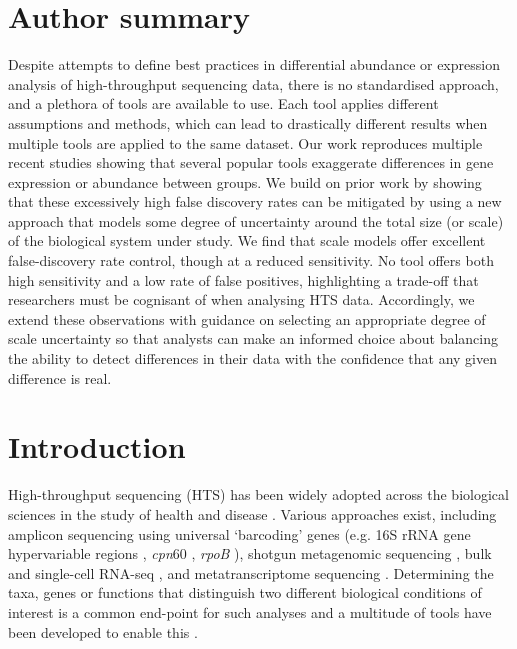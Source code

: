 \documentclass[10pt,letterpaper]{article}
\begin{document}
\section*{Author summary}
Despite attempts to define best practices in differential abundance or expression analysis of high-throughput sequencing data, there is no standardised approach, and a plethora of tools are available to use. Each tool applies different assumptions and methods, which can lead to drastically different results when multiple tools are applied to the same dataset. Our work reproduces multiple recent studies showing that several popular tools exaggerate differences in gene expression or abundance between groups. We build on prior work by showing that these excessively high false discovery rates can be mitigated by using a new approach that models some degree of uncertainty around the total size (or scale) of the biological system under study. We find that scale models offer excellent false-discovery rate control, though at a reduced sensitivity. No tool offers both high sensitivity and a low rate of false positives, highlighting a trade-off that researchers must be cognisant of when analysing HTS data. Accordingly, we extend these observations with guidance on selecting an appropriate degree of scale uncertainty so that analysts can make an informed choice about balancing the ability to detect differences in their data with the confidence that any given difference is real.

\linenumbers


\section*{Introduction}

High-throughput sequencing (HTS) has been widely adopted across the biological sciences in the study of health and disease \cite{malla_exploring_2019, Montgomery:2022aa}. Various approaches exist, including amplicon sequencing using universal `barcoding' genes (e.g. 16S rRNA gene hypervariable regions \cite{johnson_evaluation_2019}, \textit{cpn}60 \cite{vancuren_variant_2020}, \textit{rpoB} \cite{ogier_rpob_2019}), shotgun metagenomic sequencing \cite{quince_shotgun_2017}, bulk and single-cell RNA-seq \cite{gate_clonally_2020,jovic_single_2022}, and metatranscriptome sequencing \cite{france_insight_2022}. Determining the taxa, genes or functions that distinguish two different biological conditions of interest is a common end-point for such analyses and a multitude of tools have been developed to enable this \cite{Quinn:2019aa, liu_practical_2021}.
\end{document}
